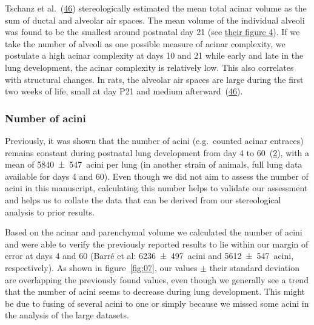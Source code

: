\documentclass[
  american,
]{article}
\begin{document}
Tschanz et al.~(\protect\hyperlink{ref-wnl86DEM}{46}) stereologically estimated the mean total acinar volume as the sum of ductal and alveolar air spaces.
The mean volume of the individual alveoli was found to be the smallest around postnatal day 21 (see \href{https://www.physiology.org/na101/home/literatum/publisher/physio/journals/content/jappl/2014/jappl.2014.117.issue-1/japplphysiol.01355.2013/production/images/medium/zdg0121410620004.jpeg}{their figure 4}).
If we take the number of alveoli as one possible measure of acinar complexity, we postulate a high acinar complexity at days 10 and 21 while early and late in the lung development, the acinar complexity is relatively low.
This also correlates with structural changes.
In rats, the alveolar air spaces are large during the first two weeks of life, small at day P21 and medium afterward~(\protect\hyperlink{ref-wnl86DEM}{46}).

\hypertarget{number-of-acini-1}{%
\subsubsection{Number of acini}\label{number-of-acini-1}}

Previously, it was shown that the number of acini (e.g.~counted acinar entraces) remains constant during postnatal lung development from day 4 to 60~(\protect\hyperlink{ref-14OP85b2F}{2}), with a mean of 5840~±~547~acini per lung (in another strain of animals, full lung data available for days 4 and 60).
Even though we did not aim to assess the number of acini in this manuscript, calculating this number helps to validate our assessment and helps us to collate the data that can be derived from our stereological analysis to prior results.

Based on the acinar and parenchymal volume we calculated the number of acini and were able to verify the previously reported results to lie within our margin of error at days 4 and 60 (Barré et al: 6236~±~497~acini and 5612~±~547~acini, respectively).
As shown in figure~\ref{fig:07}, our values \(\pm\) their standard deviation are overlapping the previously found values, even though we generally see a trend that the number of acini seems to decrease during lung development.
This might be due to fusing of several acini to one or simply because we missed some acini in the analysis of the large datasets.
\end{document}
